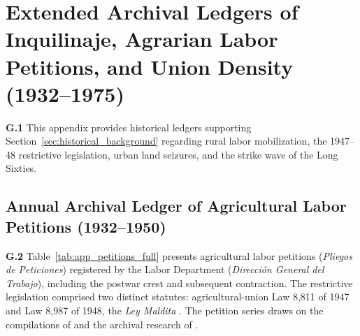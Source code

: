 \section{Extended Archival Ledgers of Inquilinaje, Agrarian Labor Petitions, and Union Density (1932--1975)}
\label{app:historical_labor_ledgers}

\textbf{G.1} This appendix provides historical ledgers supporting Section~\ref{sec:historical_background} regarding rural labor mobilization, the 1947--48 restrictive legislation, urban land seizures, and the strike wave of the Long Sixties.

\subsection{Annual Archival Ledger of Agricultural Labor Petitions (1932--1950)}
\label{app:petitions_ledger}

\textbf{G.2} Table~\ref{tab:app_petitions_full} presents agricultural labor petitions (\textit{Pliegos de Peticiones}) registered by the Labor Department (\textit{Dirección General del Trabajo}), including the postwar crest and subsequent contraction. The restrictive legislation comprised two distinct statutes: agricultural-union Law 8,811 of 1947 and Law 8,987 of 1948, the \textit{Ley Maldita} \citep{Chile1947,Chile1948}. The petition series draws on the compilations of \citet{MorrisOyaneder1962} and the archival research of \citet{Loveman1971,Loveman1976}.

